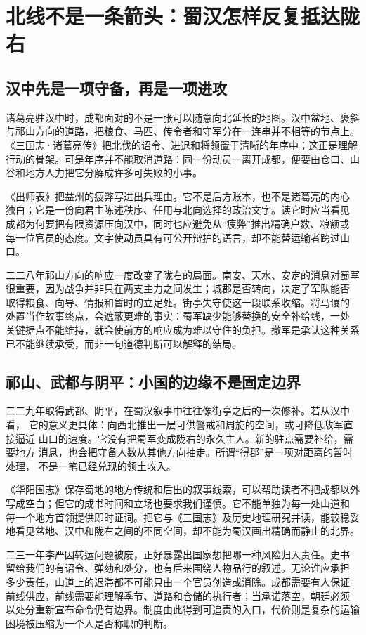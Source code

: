 \section{北线不是一条箭头：蜀汉怎样反复抵达陇右}

\subsection{汉中先是一项守备，再是一项进攻}

诸葛亮驻汉中时，成都面对的不是一张可以随意向北延长的地图。汉中盆地、褒斜
与祁山方向的道路，把粮食、马匹、传令者和守军分在一连串并不相等的节点上。
《三国志·诸葛亮传》把北伐的诏令、进退和将领置于清晰的年序中；这正是理解
行动的骨架。可是年序并不能取消道路：同一份动员一离开成都，便要由仓口、山
谷和地方人力把它分解成许多可失败的小事。

《出师表》把益州的疲弊写进出兵理由。它不是后方账本，也不是诸葛亮的内心
独白；它是一份向君主陈述秩序、任用与北向选择的政治文字。读它时应当看见
成都为何要把有限资源压向汉中，同时也应避免从“疲弊”推出精确户数、粮额或
每一位官员的态度。文字使动员具有可公开辩护的语言，却不能替运输者跨过山口。

二二八年祁山方向的响应一度改变了陇右的局面。南安、天水、安定的消息对蜀军
很重要，因为战争并非只在两支主力之间发生；城郡是否转向，决定了军队能否
取得粮食、向导、情报和暂时的立足处。街亭失守使这一段联系收缩。将马谡的
处置当作故事终点，会遮蔽更难的事实：蜀军缺少能够替换的安全补给线，一处
关键据点不能维持，就会使前方的响应成为难以守住的负担。撤军是承认这种关系
已不能继续承受，而非一句道德判断可以解释的结局。

\subsection{祁山、武都与阴平：小国的边缘不是固定边界}

二二九年取得武都、阴平，在蜀汉叙事中往往像街亭之后的一次修补。若从汉中看，
它的意义更具体：向西北推出一层可供警戒和周旋的空间，或可降低敌军直接逼近
山口的速度。它没有把蜀军变成陇右的永久主人。新的驻点需要补给，需要地方
消息，也会把守备人数从其他方向抽走。所谓“得郡”是一项对距离的暂时处理，
不是一笔已经兑现的领土收入。

《华阳国志》保存蜀地的地方传统和后出的叙事线索，可以帮助读者不把成都以外
写成空白；但它的成书时间和立场也要求我们谨慎。它不能单独为每一处山道和
每一个地方首领提供即时证词。把它与《三国志》及历史地理研究并读，能较稳妥
地看见盆地、汉中和陇右之间的不同空间，却不能为蜀汉画出精确而静止的北界。

二三一年李严因转运问题被废，正好暴露出国家想把哪一种风险归入责任。史书
留给我们的有诏令、弹劾和处分，也有后来围绕人物品行的叙述。无论谁应承担
多少责任，山道上的迟滞都不可能只由一个官员创造或消除。成都需要有人保证
前线供应，前线需要能理解季节、道路和仓储的执行者；当承诺落空，朝廷必须
以处分重新宣布命令仍有边界。制度由此得到可追责的入口，代价则是复杂的运输
困境被压缩为一个人是否称职的判断。

